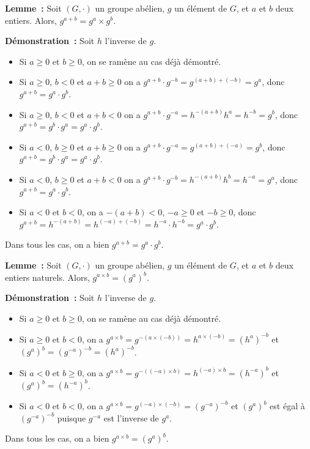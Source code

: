     \done

\medskip

\noindent\textbf{Lemme :} Soit $(G,\cdot)$ un groupe abélien, $g$ un élément de $G$, et $a$ et $b$ deux entiers.
    Alors, $g^{a+b} = g^a \times g^b$.

\medskip

\noindent\textbf{Démonstration :} Soit $h$ l'inverse de $g$. 
    \begin{itemize}[nosep]
        \item Si $a \geq 0$ et $b \geq 0$, on se ramène au cas déjà démontré.
        \item Si $a \geq 0$, $b < 0$ et $a+b \geq 0$ on a $g^{a+b} \cdot g^{-b} = g^{(a+b) + (-b)}= g^a$, donc $g^{a+b} = g^a \cdot g^b$.
        \item Si $a \geq 0$, $b < 0$ et $a+b < 0$ on a $g^{a+b} \cdot g^{-a} = h^{-(a+b)} h^a = h^{-b} = g^b$, donc $g^{a+b} = g^b \cdot g^a = g^a \cdot g^b$.
        \item Si $a < 0$, $b \geq 0$ et $a+b \geq 0$ on a $g^{a+b} \cdot g^{-a} = g^{(a+b) + (-a)} = g^b$, donc $g^{a+b} = g^b \cdot g^a = g^a \cdot g^b$.
        \item Si $a < 0$, $b \geq 0$ et $a+b < 0$ on a $g^{a+b} \cdot g^{-b} = h^{-(a+b)} h^b = h^{-a} = g^a$, donc $g^{a+b} = g^a \cdot g^b$.
        \item Si $a < 0$ et $b < 0$, on a $-(a+b) < 0$, $-a \geq 0$ et $-b \geq 0$, donc $g^{a+b} = h^{-(a+b)} = h^{(-a) + (-b)} = h^{-a} \cdot h^{-b} = g^a \cdot g^b$.
    \end{itemize}
    Dans tous les cas, on a bien $g^{a+b} = g^a \cdot g^b$.

    \done

\medskip

\noindent\textbf{Lemme :} Soit $(G,\cdot)$ un groupe abélien, $g$ un élément de $G$, et $a$ et $b$ deux entiers naturels. 
    Alors, $g^{a \times b} = (g^a)^b$.

\medskip

\noindent\textbf{Démonstration :} Soit $h$ l'inverse de $g$. 
    \begin{itemize}[nosep]
        \item Si $a \geq 0$ et $b \geq 0$, on se ramène au cas déjà démontré.
        \item Si $a \geq 0$ et $b < 0$, on a $g^{a \times b} = g^{-(a \times (-b))} = h^{a \times (-b)} = (h^a)^{-b}$ et $(g^a)^b = (g^{-a})^{-b} = (h^a)^{-b}$.
        \item Si $a < 0$ et $b \geq 0$, on a $g^{a \times b} = g^{-((-a) \times b)} = h^{(-a) \times b} = (h^{-a})^b$ et $(g^a)^b = (h^{-a})^b$.
        \item Si $a < 0$ et $b < 0$, on a $g^{a \times b} = g^{(-a) \times (-b)} = (g^{-a})^{-b}$ et $(g^a)^b$ est égal à $(g^{-a})^{-b}$ puisque $g^{-a}$ est l'inverse de $g^a$.
    \end{itemize}
    Dans tous les cas, on a bien $g^{a \times b} = (g^a)^b$.

